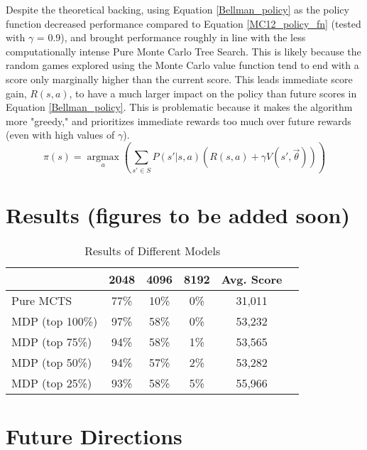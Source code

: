 \documentclass{article}
\DeclareMathOperator*{\argmax}{argmax}
\begin{document}
Despite the theoretical backing, using Equation \ref{Bellman_policy} as the policy function decreased performance compared to Equation \ref{MC12_policy_fn} (tested with $\gamma$ = 0.9), and brought performance roughly in line with the less computationally intense Pure Monte Carlo Tree Search.  This is likely because the random games explored using the Monte Carlo value function tend to end with a score only marginally higher than the current score.  This leads immediate score gain, $R(s, a)$, to have a much larger impact on the policy than future scores in Equation \ref{Bellman_policy}.  This is problematic because it makes the algorithm more "greedy," and prioritizes immediate rewards too much over future rewards (even with high values of $\gamma$).
\begin{equation}
\label{Bellman_policy}
\pi(s) = \argmax\limits_{a}\left( \sum\limits_{s' \in S} P(s'|s, a)(R(s,a) + \gamma V(s', \vec{\theta})) \right)
\end{equation}


\section{Results (figures to be added soon)}


\begin{table}[h]
  \caption{Results of Different Models}
  \begin{tabular}{|l|c|c|c|c|c|}
    \hline
    & 2048 & 4096 & 8192 & Avg. Score \\
    \hline
    Pure MCTS & 77\% & 10\% & 0\% & 31,011 \\
    \hline
    MDP (top 100\%) & \cellcolor{green!25}97\% & \cellcolor{green!25}58\% & 0\% & 53,232\\
    \hline
    MDP (top 75\%) & 94\% & \cellcolor{green!25}58\% & 1\% & 53,565\\
    \hline
    MDP (top 50\%) & 94\% & 57\% & 2\% & 53,282\\
    \hline
    MDP (top 25\%) & 93\% & \cellcolor{green!25}58\% & \cellcolor{green!25}5\% & \cellcolor{green!25}55,966 \\
    \hline
  \end{tabular}
\end{table}

\section{Future Directions}
\end{document}
